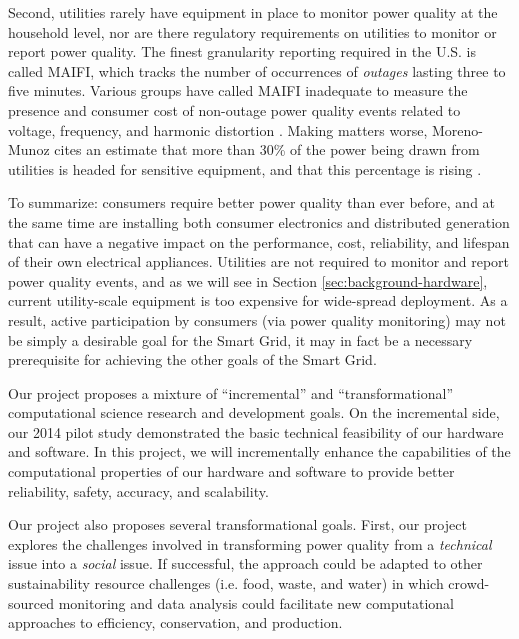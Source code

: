 Second, utilities rarely have equipment in place to monitor power quality at the household level, nor are there regulatory requirements on utilities to monitor or report power quality. The finest granularity reporting required in the U.S. is called MAIFI, which tracks the number of occurrences of {\em outages} lasting three to five minutes. Various groups have called MAIFI inadequate to measure the presence and consumer cost of non-outage power quality events related to voltage, frequency, and harmonic distortion \cite{Rouse2011,LaCommare2004,Eto2008}. Making matters worse, Moreno-Munoz cites an estimate that more than 30\% of the power being drawn from utilities is headed for sensitive equipment, and that this percentage is rising \cite{Moreno-Munoz2007}. 

To summarize: consumers require better power quality than ever before, and at the same time are installing both consumer electronics and distributed generation that can have a negative impact on the performance, cost, reliability, and lifespan of their own electrical appliances. Utilities are not required to monitor and report power quality events, and as we will see in Section \ref{sec:background-hardware}, current utility-scale equipment is too expensive for wide-spread deployment. As a result, active participation by consumers (via power quality monitoring) may not be simply a desirable goal for the Smart Grid, it may in fact be a necessary prerequisite for achieving the other goals of the Smart Grid. 

Our project proposes a mixture of ``incremental'' and ``transformational'' computational science research and development goals. On the incremental side, our 2014 pilot study \cite{g1-pilot-study} demonstrated the basic technical feasibility of our hardware and software. In this project, we will incrementally enhance the capabilities of the computational properties of our hardware and software to provide better reliability, safety, accuracy, and scalability.   

Our project also proposes several transformational goals.  First, our project explores the challenges involved in transforming power quality from a {\em technical} issue into a {\em social} issue. If successful, the approach could be adapted to other sustainability resource challenges (i.e. food, waste, and water) in which crowd-sourced monitoring and data analysis could facilitate new computational approaches to efficiency, conservation, and production.

